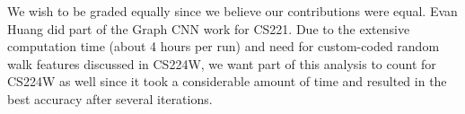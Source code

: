 We wish to be graded equally since we believe
our contributions were equal. Evan Huang did part of the Graph CNN work for CS221. Due to the extensive computation time (about 4 hours per run) and need
for custom-coded random walk features discussed in CS224W, we want part of this analysis to count for CS224W as well since it took a considerable amount of time and resulted in the best accuracy after several iterations.

